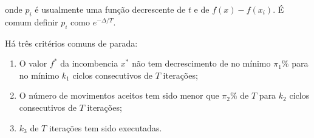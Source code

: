 \documentclass[a4paper, 12pt]{article}
\begin{document}
 onde $p_i$ é usualmente uma função decrescente de $t$ e de $f(x)-f(x_i)$. É comum definir $p_i$
como $e^{-\Delta/T}.$

 Há três critérios comuns de parada:

\begin{enumerate}
\item O valor $f^*$ da incombencia $x^*$ não tem decrescimento de no mínimo $\pi_1\%$ para no mínimo
$k_1$ ciclos consecutivos de $T$ iterações;
\item O número de movimentos aceitos tem sido menor que $\pi_2\%$ de $T$ para $k_2$ ciclos
consecutivos de $T$ iterações;
\item $k_3$ de $T$ iterações tem sido executadas.
\end{enumerate}

 
\end{document}

